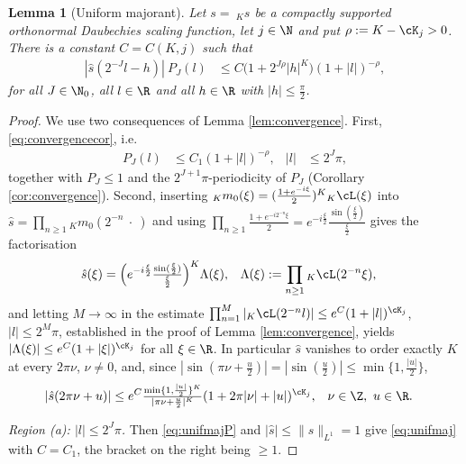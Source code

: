 \documentclass[a4paper, 11pt]{article}
\DeclareMathOperator{\1}{\mathds{1}}
\newtheorem{lemma}[thm]{Lemma}
\begin{document}
\begin{lemma}[Uniform majorant]
\label{lem:unifmaj}
Let $s=\!\ _{K}s$ be a compactly supported orthonormal Daubechies scaling function, let $j\in\N$ and put $\rho:=K-\cK_{j}>0$. There is a constant $C=C(K,j)$ such that
\begin{align}
\label{eq:unifmaj}
|\hat{s}(2^{-J}l-h)|\!\ P_{J}(l) & \leq C\big(1+2^{J\rho}|h|^{K}\big)(1+|l|)^{-\rho},
\end{align}
for all $J\in\N_{0}$, all $l\in\R$ and all $h\in\R$ with $|h|\leq\tfrac{\pi}{2}$.
\end{lemma}
\begin{proof}
We use two consequences of Lemma \ref{lem:convergence}. First, \eqref{eq:convergencecor}, i.e.
\begin{align}
\label{eq:unifmajP}
P_{J}(l) & \leq C_{1}(1+|l|)^{-\rho}, & |l| & \leq2^{J}\pi,
\end{align}
together with $P_{J}\leq1$ and the $2^{J+1}\pi$-periodicity of $P_{J}$ (Corollary \ref{cor:convergence}). Second, inserting $_{K}m_{0}(\xi)=(\tfrac{1+e^{-i\xi}}{2})^{K}{}_{K}\cL(\xi)$ into $\hat{s}=\prod_{n\geq1}{}_{K}m_{0}(2^{-n}\!\ \cdot\!\ )$ and using $\prod_{n\geq1}\tfrac{1+e^{-i2^{-n}\xi}}{2} = e^{-i\frac{\xi}{2}}\tfrac{\sin(\frac{\xi}{2})}{\frac{\xi}{2}}$ gives the factorisation
\begin{align}
\label{eq:shatfactor}
\hat{s}(\xi) & = \Big(e^{-i\frac{\xi}{2}}\tfrac{\sin(\frac{\xi}{2})}{\frac{\xi}{2}}\Big)^{K}\Lambda(\xi), & \Lambda(\xi) & := \prod_{n\geq1}{}_{K}\cL(2^{-n}\xi),
\end{align}
and letting $M\rightarrow\infty$ in the estimate $\prod_{n=1}^{M}|{}_{K}\cL(2^{-n}l)|\leq e^{C}(1+|l|)^{\cK_{j}}$, $|l|\leq2^{M}\pi$, established in the proof of Lemma \ref{lem:convergence}, yields $|\Lambda(\xi)|\leq e^{C}(1+|\xi|)^{\cK_{j}}$ for all $\xi\in\R$. In particular $\hat{s}$ vanishes to order exactly $K$ at every $2\pi\nu$, $\nu\neq0$, and, since $|\sin(\pi\nu+\tfrac{u}{2})|=|\sin(\tfrac{u}{2})|\leq\min\{1,\tfrac{|u|}{2}\}$,
\begin{align}
\label{eq:shatzero}
|\hat{s}(2\pi\nu+u)| & \leq e^{C}\tfrac{\min\{1,\frac{|u|}{2}\}^{K}}{|\pi\nu+\frac{u}{2}|^{K}}(1+2\pi|\nu|+|u|)^{\cK_{j}}, & \nu & \in\Z,\ u\in\R.
\end{align}

\emph{Region (a): $|l|\leq2^{J}\pi$.} Then \eqref{eq:unifmajP} and $|\hat{s}|\leq\|s\|_{L^{1}}=1$ give \eqref{eq:unifmaj} with $C=C_{1}$, the bracket on the right being $\geq1$.


\end{proof}
\end{document}
